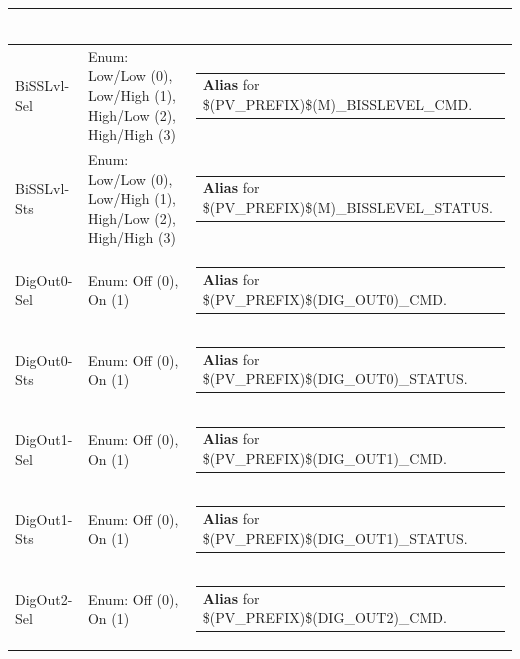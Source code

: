 \documentclass[openany]{article}
\begin{document}
\begin{longtable}{| m{4.5cm} m{2.5cm}  m{8.5cm} |}
\begin{tabular}{@{}m{6cm}@{}}
            \end{tabular} \hypertarget{pv:biss-lvl}{}\\ \hline
        BiSSLvl-Sel & Enum: Low/Low (0), Low/High (1), High/Low (2), High/High (3) & \begin{tabular}{@{}m{6cm}@{}}
                \textbf{\color{blue} Alias} for \$(PV\_PREFIX)\$(M)\_BISSLEVEL\_CMD.
            \end{tabular} \hypertarget{}{}\\ \hline
        BiSSLvl-Sts & Enum: Low/Low (0), Low/High (1), High/Low (2), High/High (3) & \begin{tabular}{@{}m{6cm}@{}}
                \textbf{\color{blue} Alias} for \$(PV\_PREFIX)\$(M)\_BISSLEVEL\_STATUS.
            \end{tabular} \hypertarget{pv:dig-out-0}{}\\ \hline
        DigOut0-Sel & Enum: Off (0), On (1) & \begin{tabular}{@{}m{6cm}@{}}
                \textbf{\color{blue} Alias} for \$(PV\_PREFIX)\$(DIG\_OUT0)\_CMD.
            \end{tabular} \hypertarget{}{}\\ \hline
        DigOut0-Sts & Enum: Off (0), On (1) & \begin{tabular}{@{}m{6cm}@{}}
                \textbf{\color{blue} Alias} for \$(PV\_PREFIX)\$(DIG\_OUT0)\_STATUS.
            \end{tabular} \hypertarget{pv:dig-out-1}{}\\ \hline
        DigOut1-Sel & Enum: Off (0), On (1) & \begin{tabular}{@{}m{6cm}@{}}
                \textbf{\color{blue} Alias} for \$(PV\_PREFIX)\$(DIG\_OUT1)\_CMD.
            \end{tabular} \hypertarget{}{}\\ \hline
        DigOut1-Sts & Enum: Off (0), On (1) & \begin{tabular}{@{}m{6cm}@{}}
                \textbf{\color{blue} Alias} for \$(PV\_PREFIX)\$(DIG\_OUT1)\_STATUS.
            \end{tabular} \hypertarget{pv:dig-out-2}{}\\ \hline
        DigOut2-Sel & Enum: Off (0), On (1) & \begin{tabular}{@{}m{6cm}@{}}
                \textbf{\color{blue} Alias} for \$(PV\_PREFIX)\$(DIG\_OUT2)\_CMD.

\end{tabular}
\end{longtable}
\end{document}
